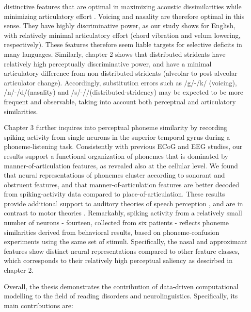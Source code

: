distinctive features that are optimal in maximizing acoustic dissimilarities while minimizing articulatory effort \citep{stevens1989quantal, stevens2002toward}. Voicing and nasality are therefore optimal in this sense. They have highly discriminative power, as our study shows for English, with relatively minimal articulatory effort (chord vibration and velum lowering, respectively). These features therefore seem liable targets for selective deficits in many languages. Similarly, chapter 2 shows that distributed stridents have relatively high perceptually discriminative power, and have a minimal articulatory difference from non-distributed stridents (alveolar to post-alveolar articulator change). Accordingly, substitution errors such as /g/-/k/ (voicing), /n/-/d/(nasality) and /s/-//(distributed-stridency) may be expected to be more frequent and observable, taking into account both perceptual and articulatory similarities.

Chapter 3 further inquires into perceptual phoneme similarity by recording spiking activity from single neurons in the superior temporal gyrus during a phoneme-listening task. Consistently with previous ECoG and EEG studies, our results support a functional organization of phonemes that is dominated by manner-of-articulation features, as revealed also at the cellular level. We found that neural representations of phonemes cluster according to sonorant and obstruent features, and that manner-of-articulation features are better decoded from spiking-activity data compared to place-of-articulation. These results provide additional support to auditory theories of speech perception \citep{stevens1989quantal, stevens2002toward}, and are in contrast to motor theories \citep{liberman1985motor, browman1992articulatory}. Remarkably, spiking activity from a relatively small number of neurons - fourteen, collected from six patients - reflects phoneme similarities derived from behavioral results, based on phoneme-confusion experiments using the same set of stimuli. Specifically, the nasal and approximant features show distinct neural representations compared to other feature classes, which corresponds to their relatively high perceptual saliency as descirbed in chapter 2. 

Overall, the thesis demonstrates the contribution of data-driven computational modelling to the field of reading disorders and neurolinguistics. Specifically, its main contributions are:


